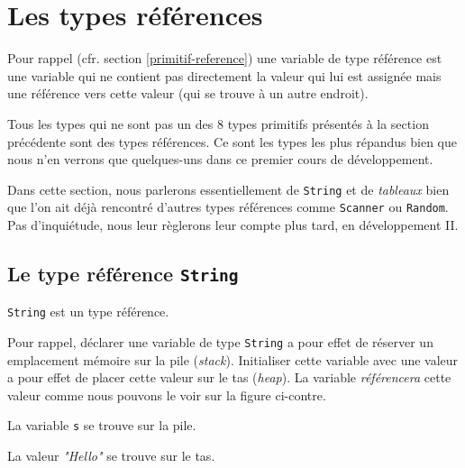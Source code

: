 \section{Les types références}

Pour rappel (cfr. section \vref{primitif-reference}) une variable de type
référence est une variable qui ne contient pas directement la valeur qui lui
est assignée mais une référence vers cette valeur (qui se trouve à un autre
endroit).  

Tous les types qui ne sont pas un des 8 types primitifs présentés à la section
précédente sont des types références. Ce sont les types les plus répandus bien
que nous n'en verrons que quelques-uns dans ce premier cours de développement. 

Dans cette section, nous parlerons essentiellement de \texttt{String} et de
\textit{tableaux} bien que l'on ait déjà rencontré d'autres types références
comme \texttt{Scanner} ou \texttt{Random}. Pas d'inquiétude, nous leur règlerons
leur compte plus tard, en développement II. 

\clearpage
\subsection{Le type référence \texttt{String}}

\texttt{String} est un type référence. 

\begin{figure}
	\begin{center}
	\end{center}
\end{figure}

Pour rappel, déclarer une variable de type \texttt{String} a pour effet de
réserver un emplacement mémoire sur la pile (\textit{stack}). Initialiser cette
variable avec une valeur a pour effet de placer cette valeur sur le tas
(\textit{heap}). La variable \textit{référencera} cette valeur comme nous
pouvons le voir sur la figure ci-contre. 

La variable \texttt{s} se trouve sur la pile. 

La valeur \textit{"Hello"} se trouve sur le tas. 

